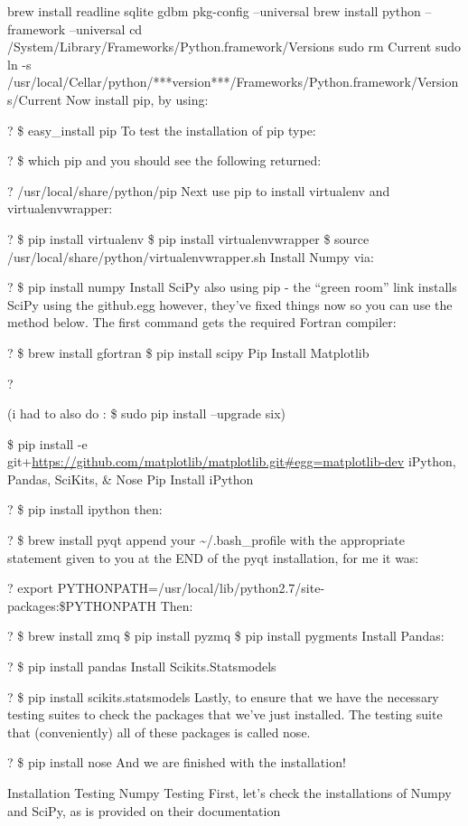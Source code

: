 \documentclass[11pt]{article}
\begin{document}
brew install readline sqlite gdbm pkg-config --universal
brew install python --framework --universal
cd /System/Library/Frameworks/Python.framework/Versions
sudo rm Current
sudo ln -s /usr/local/Cellar/python/***version***/Frameworks/Python.framework/Versions/Current
Now install pip, by using:

?
\$ easy\_install pip
To test the installation of pip type:

?
\$ which pip
and you should see the following returned:

?
/usr/local/share/python/pip
Next use pip to install virtualenv and virtualenvwrapper:

?
\$ pip install virtualenv
\$ pip install virtualenvwrapper
\$ source /usr/local/share/python/virtualenvwrapper.sh
Install Numpy via:

?
\$ pip install numpy
Install SciPy also using pip - the “green room” link installs SciPy using the github.egg however, they’ve fixed things now so you can use the method below. The first command gets the required Fortran compiler:

?
\$ brew install gfortran
\$ pip install scipy
Pip Install Matplotlib

?

(i had to also do : \$ sudo pip install --upgrade six)

\$ pip install -e git+\url{https://github.com/matplotlib/matplotlib.git#egg=matplotlib-dev}
iPython, Pandas, SciKits, \& Nose
Pip Install iPython

?
\$ pip install ipython
then:

?
\$ brew install pyqt
append your \textasciitilde{}/.bash\_profile with the appropriate statement given to you at the END of the pyqt installation, for me it was:

?
export PYTHONPATH=/usr/local/lib/python2.7/site-packages:\$PYTHONPATH
Then:

?
\$ brew install zmq
\$ pip install pyzmq
\$ pip install pygments
Install Pandas:

?
\$ pip install pandas
Install Scikits.Statsmodels

?
\$ pip install scikits.statsmodels        
Lastly, to ensure that we have the necessary testing suites to check the packages that we’ve just installed. The testing suite that (conveniently) all of these packages is called nose.

?
\$ pip install nose
And we are finished with the installation!

Installation Testing
Numpy Testing
First, let’s check the installations of Numpy and SciPy, as is provided on their documentation
\end{document}
